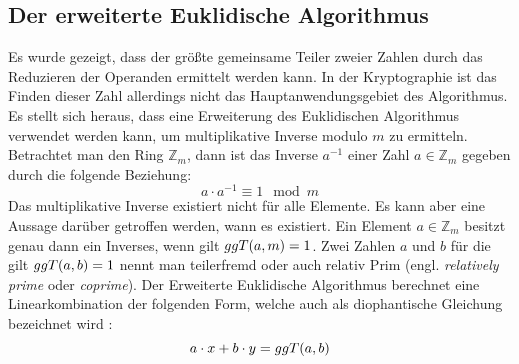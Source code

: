 \subsection{Der erweiterte Euklidische Algorithmus}
Es wurde gezeigt, dass der größte gemeinsame Teiler zweier Zahlen durch
das Reduzieren der Operanden ermittelt werden kann. In der Kryptographie ist
das Finden dieser Zahl allerdings nicht das Hauptanwendungsgebiet des
Algorithmus. Es stellt sich heraus, dass eine Erweiterung des Euklidischen Algorithmus
verwendet werden kann, um multiplikative Inverse modulo $m$ zu ermitteln.
Betrachtet man den Ring $\mathbb{Z}_m$, dann ist das Inverse $a^{-1}$
einer Zahl $a \in \mathbb{Z}_m$ gegeben durch die folgende Beziehung:
\begin{equation}
  \label{eq:inverse}
  a \cdot a^{-1} \equiv 1 \mod{m}
\end{equation}
Das multiplikative Inverse existiert nicht für alle Elemente. Es kann aber eine Aussage
darüber getroffen werden, wann es existiert. Ein Element
$a \in \mathbb{Z}_m$ besitzt genau dann ein Inverses, wenn gilt $ggT(a,m) = 1$.
Zwei Zahlen $a$ und $b$ für die gilt $ggT(a,b) = 1$ nennt man teilerfremd oder auch
relativ Prim (engl. \textit{relatively prime} oder \textit{coprime}).
Der Erweiterte Euklidische Algorithmus berechnet eine Linearkombination der folgenden Form,
welche auch als diophantische Gleichung
bezeichnet wird \parencite[160]{BOOK:crypto} \parencite{SITE:diophant}:
\begin{equation*}
  a \cdot x + b \cdot y = ggT(a,b)
\end{equation*}

